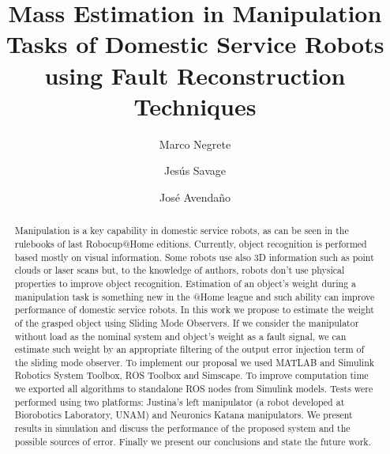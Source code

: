 \documentclass[a4paper, 10pt]{article}
\title{Mass Estimation in Manipulation Tasks of Domestic Service Robots using Fault Reconstruction Techniques}
\author{Marco Negrete \and Jesús Savage \and José Avendaño}
\begin{document}
\maketitle
\begin{abstract}
  Manipulation is a key capability in domestic service robots, as can be seen in the rulebooks of last Robocup@Home editions. Currently, object recognition is performed based mostly on visual information. Some robots use also 3D information such as point clouds or laser scans but, to the knowledge of authors, robots don't use physical properties to improve object recognition. Estimation of an object's weight during a manipulation task is something new in the @Home league and such ability can improve performance of domestic service robots. In this work we propose to estimate the weight of the grasped object using Sliding Mode Observers. If we consider the manipulator without load as the nominal system and object's weight as a fault signal, we can estimate such weight by an appropriate filtering of the output error injection term of the sliding mode observer. To implement our proposal we used MATLAB and Simulink Robotics System Toolbox, ROS Toolbox and Simscape. To improve computation time we exported all algorithms to standalone ROS nodes from Simulink models. Tests were performed using two platforms: Justina's left manipulator (a robot developed at Biorobotics Laboratory, UNAM) and Neuronics Katana manipulators. We present results in simulation and discuss the performance of the proposed system and the possible sources of error. Finally we present our conclusions and state the future work. 
\end{abstract}
\end{document}
